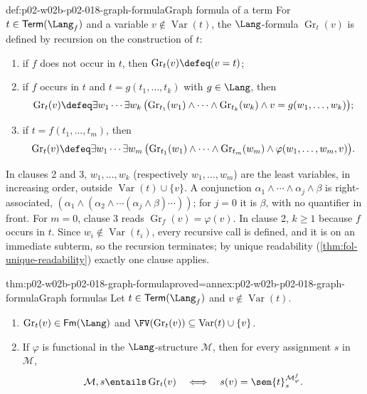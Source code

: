 \begin{hbdefinition}{def:p02-w02b-p02-018-graph-formula}{Graph formula of a term}
For \(t\in\mathsf{Term}(\Lang_f)\) and a variable \(v\notin\operatorname{Var}(t)\),
the \(\Lang\)-formula \(\operatorname{Gr}_{t}(v)\) is defined by recursion
on the construction of \(t\):
\begin{enumerate}
 \item if \(f\) does not occur in \(t\), then
       \(\operatorname{Gr}_{t}(v)\defeq(v=t)\);
 \item if \(f\) occurs in \(t\) and \(t=g(t_1,\ldots,t_k)\) with \(g\in\Lang\),
       then
       \[
        \operatorname{Gr}_{t}(v)\defeq
        \exists w_1\cdots\exists w_k\,
        \bigl(\operatorname{Gr}_{t_1}(w_1)\land\cdots\land
        \operatorname{Gr}_{t_k}(w_k)\land v=g(w_1,\ldots,w_k)\bigr);
       \]
 \item if \(t=f(t_1,\ldots,t_m)\), then
       \[
        \operatorname{Gr}_{t}(v)\defeq
        \exists w_1\cdots\exists w_m\,
        \bigl(\operatorname{Gr}_{t_1}(w_1)\land\cdots\land
        \operatorname{Gr}_{t_m}(w_m)\land\varphi(w_1,\ldots,w_m,v)\bigr).
       \]
\end{enumerate}
In clauses 2 and 3, \(w_1,\ldots,w_k\) (respectively \(w_1,\ldots,w_m\)) are
the least variables, in increasing order, outside
\(\operatorname{Var}(t)\cup\{v\}\).  A conjunction
\(\alpha_1\land\cdots\land\alpha_j\land\beta\) is right-associated,
\((\alpha_1\land(\alpha_2\land\cdots(\alpha_j\land\beta)\cdots))\); for
\(j=0\) it is \(\beta\), with no quantifier in front.  For \(m=0\), clause 3
reads \(\operatorname{Gr}_{f}(v)=\varphi(v)\).  In clause 2, \(k\geq1\)
because \(f\) occurs in \(t\).  Since \(w_i\notin\operatorname{Var}(t_i)\),
every recursive call is defined, and it is on an immediate subterm, so the
recursion terminates; by unique readability
(\cref{thm:fol-unique-readability}) exactly one clause applies.
\end{hbdefinition}

\begin{hblemma}{thm:p02-w02b-p02-018-graph-formula}{proved=annex:p02-w02b-p02-018-graph-formula}{Graph formulas}
Let \(t\in\mathsf{Term}(\Lang_f)\) and \(v\notin\operatorname{Var}(t)\).
\begin{enumerate}
 \item \(\operatorname{Gr}_{t}(v)\in\mathsf{Fm}(\Lang)\) and
       \(\FV(\operatorname{Gr}_{t}(v))\subseteq\operatorname{Var}(t)\cup\{v\}\).
 \item If \(\varphi\) is functional in the \(\Lang\)-structure
       \(\mathcal M\), then for every assignment \(s\) in \(\mathcal M\),
       \[
        \mathcal M,s\entails\operatorname{Gr}_{t}(v)
        \quad\Longleftrightarrow\quad
        s(v)=\sem{t}^{\mathcal M^{f}_{\varphi}}_s .
       \]
\end{enumerate}
\end{hblemma}

